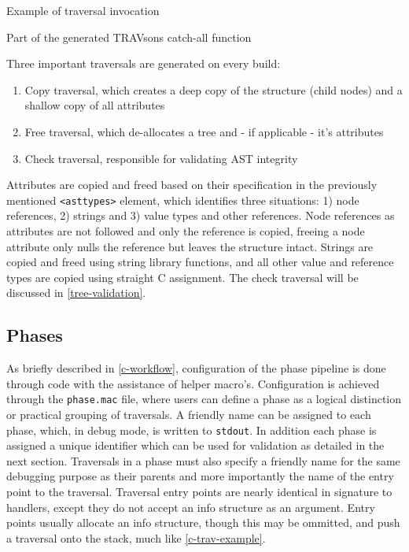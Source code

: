 \documentclass[twoside,openright]{uva-bachelor-thesis}
\newcommand{\code}[1]{\texttt{\footnotesize#1}}
\begin{document}
			\begin{codebox}[label=c-trav-example]{Example of traversal invocation}
			\end{codebox}
			
			\begin{codebox}[label=c-trav-sons]{Part of the generated TRAVsons catch-all function}
			\end{codebox}
			
			Three important traversals are generated on every build:
			\begin{enumerate}
				\item Copy traversal, which creates a deep copy of the structure (child nodes) and a shallow copy of all attributes
				\item Free traversal, which de-allocates a tree and - if applicable - it's attributes
				\item Check traversal, responsible for validating AST integrity
			\end{enumerate}
			
			Attributes are copied and freed based on their specification in the previously mentioned \code{<asttypes>} element, which identifies three situations: 1) node references, 2) strings and 3) value types and other references. Node references as attributes are not followed and only the reference is copied, freeing a node attribute only nulls the reference but leaves the structure intact. Strings are copied and freed using string library functions, and all other value and reference types are copied using straight C assignment. The check traversal will be discussed in \cref{tree-validation}.
					
		\subsection{Phases}
		\label{old-phases}
			As briefly described in \cref{c-workflow}, configuration of the phase pipeline is done through code with the assistance of helper macro's. Configuration is achieved through the \code{phase.mac} file, where users can define a phase as a logical distinction or practical grouping of traversals. A friendly name can be assigned to each phase, which, in debug mode, is written to \code{stdout}. In addition each phase is assigned a unique identifier which can be used for validation as detailed in the next section. Traversals in a phase must also specify a friendly name for the same debugging purpose as their parents and more importantly the name of the entry point to the traversal. Traversal entry points are nearly identical in signature to handlers, except they do not accept an info structure as an argument. Entry points usually allocate an info structure, though this may be ommitted, and push a traversal onto the stack, much like \cref{c-trav-example}.
			
\end{document}
